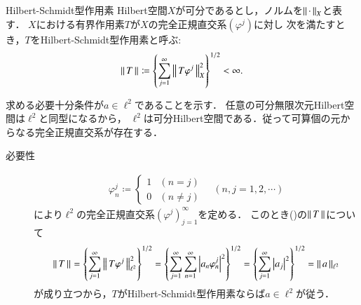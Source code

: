 \begin{prf}
\begin{description}
				\begin{itembox}[l]{Hilbert-Schmidt型作用素}
					Hilbert空間$X$が可分であるとし，ノルムを$\left\|\, \cdot\, \right\|_{X}$と表す．
					$X$における有界作用素$T$が$X$の完全正規直交系$(\varphi^j)$に対し
					次を満たすとき，$T$をHilbert-Schmidt型作用素と呼ぶ:
					\begin{align}
						\left\|\, T\, \right\|_{} \coloneqq \left\{ \sum_{j=1}^{\infty} \left\|\, T \varphi^j\, \right\|_{X}^2 \right\}^{1/2} < \infty.
						\label{eq:report_7_1}
					\end{align}
				\end{itembox}
				
				求める必要十分条件が$a \in \ell^2$であることを示す．
				任意の可分無限次元Hilbert空間は$\ell^2$と同型になるから，
				$\ell^2$は可分Hilbert空間である．従って可算個の元からなる完全正規直交系が存在する．
				\begin{description}
					\item[必要性]
						\begin{align}
							\varphi^j_n \coloneqq 
							\begin{cases}
								1 & (n = j) \\
								0 & (n \neq j)
							\end{cases}
							\quad (n,j=1,2,\cdots)
						\end{align}
						により$\ell^2$の完全正規直交系$(\varphi^j)_{j=1}^{\infty}$を定める．
						このとき()の$\left\|\, T\, \right\|_{}$について
						\begin{align}
							\left\|\, T\, \right\|_{}
							= \left\{ \sum_{j=1}^{\infty} \left\|\, T \varphi^j\, \right\|_{\ell^2}^2 \right\}^{1/2}
							= \left\{ \sum_{j=1}^{\infty} \sum_{n=1}^{\infty} \left| a_n \varphi^j_n \right|^2 \right\}^{1/2}
							= \left\{ \sum_{j=1}^{\infty} \left| a_j \right|^2 \right\}^{1/2}
							= \left\|\, a\, \right\|_{\ell^2}
							\label{eq:report_7_2}
						\end{align}
						が成り立つから，$T$がHilbert-Schmidt型作用素ならば$a \in \ell^2$が従う．
						

\end{description}
\end{description}
\end{prf}
